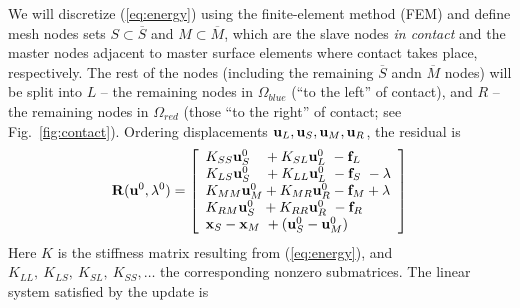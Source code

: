\documentclass[11pt]{article}
\newcommand{\vecx}{{\bf x}}
\newcommand{\vecu}{{\bf u}}
\newcommand{\vecf}{{\bf f}}
\newcommand{\vecR}{{\bf R}}
\begin{document}
We will discretize (\ref{eq:energy}) using the finite-element method (FEM) and define mesh nodes sets $S \subset {\overline S}$ and $M \subset {\overline M}$,
which are the slave nodes  \emph{in contact} and the master nodes adjacent to master surface elements where contact takes place, respectively.
The rest of the nodes (including the remaining $\overline S$ andn $\overline M$ nodes) will be split into $L$ -- the remaining nodes in $\Omega_{blue}$  (``to the left'' of contact),
and $R$ -- the remaining nodes in $\Omega_{red}$ (those ``to the right'' of contact; see Fig.~\ref{fig:contact}).
Ordering displacements $\vecu_L, \vecu_S, \vecu_M, \vecu_R$, the residual is
\begin{equation}
\label{eq:residual}
\vecR(\vecu^0,\lambda^0) =
\left[\begin{array}{l}
K_{SS} \vecu_S^0\ \ \ + K_{SL} \vecu_L^0\  - \vecf_L\\
K_{LS} \vecu_S^0\ \ \ + K_{LL} \vecu_L^0\  - \vecf_S \ - \lambda \\
K_{MM} \vecu_M^0 + K_{MR} \vecu_R^0 - \vecf_M + \lambda \\
K_{RM} \vecu_S^0\ \, + K_{RR} \vecu_R^0\  - \vecf_R\\
\vecx_S - \vecx_M \ + (\vecu_S^0 - \vecu_M^0)
\end{array}\right]
\end{equation}
Here $K$ is the stiffness matrix resulting from (\ref{eq:energy}),
and $K_{LL},\ K_{LS},\ K_{SL},\ K_{SS},\dots$ the corresponding nonzero submatrices.
The linear system satisfied by the update is
\end{document}
